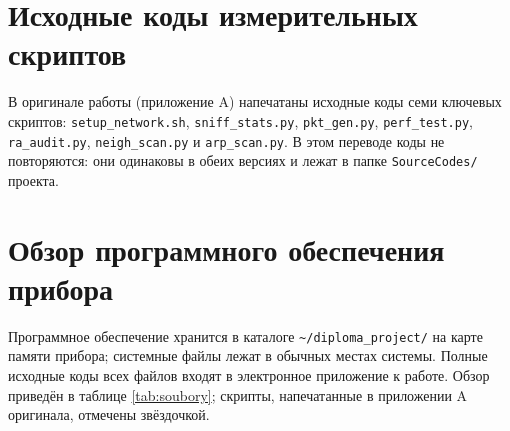 \chapter{Исходные коды измерительных скриптов}
\label{sec:Appendix1}

В оригинале работы (приложение A) напечатаны исходные коды семи ключевых скриптов: \texttt{setup\_network.sh}, \texttt{sniff\_stats.py}, \texttt{pkt\_gen.py}, \texttt{perf\_test.py}, \texttt{ra\_audit.py}, \texttt{neigh\_scan.py} и \texttt{arp\_scan.py}. В этом переводе коды не повторяются: они одинаковы в обеих версиях и лежат в папке \texttt{SourceCodes/} проекта.

\chapter{Обзор программного обеспечения прибора}
\label{sec:Appendix2}

Программное обеспечение хранится в каталоге \texttt{\textasciitilde/diploma\_project/} на карте памяти прибора; системные файлы лежат в обычных местах системы. Полные исходные коды всех файлов входят в электронное приложение к работе. Обзор приведён в таблице \ref{tab:soubory}; скрипты, напечатанные в приложении A оригинала, отмечены звёздочкой.

